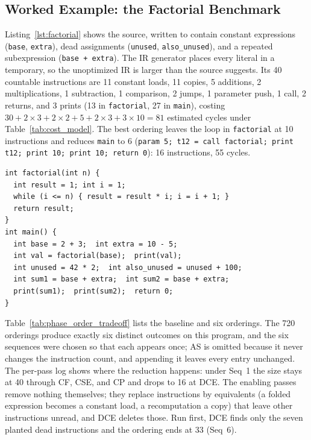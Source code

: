 \documentclass[conference]{IEEEtran}
\begin{document}
\subsection{Worked Example: the Factorial Benchmark}
\label{sec:factorial}
Listing~\ref{lst:factorial} shows the source, written to contain constant expressions (\texttt{base}, \texttt{extra}), dead assignments (\texttt{unused}, \texttt{also\_unused}), and a repeated subexpression (\texttt{base + extra}). The IR generator places every literal in a temporary, so the unoptimized IR is larger than the source suggests. Its 40 countable instructions are 11 constant loads, 11 copies, 5 additions, 2 multiplications, 1 subtraction, 1 comparison, 2 jumps, 1 parameter push, 1 call, 2 returns, and 3 prints (13 in \texttt{factorial}, 27 in \texttt{main}), costing $30 + 2 \times 3 + 2 \times 2 + 5 + 2 \times 3 + 3 \times 10 = 81$ estimated cycles under Table~\ref{tab:cost_model}. The best ordering leaves the loop in \texttt{factorial} at 10 instructions and reduces \texttt{main} to 6 (\texttt{param 5; t12 = call factorial; print t12; print 10; print 10; return 0}): 16 instructions, 55 cycles.

\begin{lstlisting}[caption={The \texttt{factorial} benchmark (comments removed).},label={lst:factorial}]
int factorial(int n) {
  int result = 1; int i = 1;
  while (i <= n) { result = result * i; i = i + 1; }
  return result;
}
int main() {
  int base = 2 + 3;  int extra = 10 - 5;
  int val = factorial(base);  print(val);
  int unused = 42 * 2;  int also_unused = unused + 100;
  int sum1 = base + extra;  int sum2 = base + extra;
  print(sum1);  print(sum2);  return 0;
}
\end{lstlisting}

Table~\ref{tab:phase_order_tradeoff} lists the baseline and six orderings. The 720 orderings produce exactly six distinct outcomes on this program, and the six sequences were chosen so that each appears once; AS is omitted because it never changes the instruction count, and appending it leaves every entry unchanged. The per-pass log shows where the reduction happens: under Seq~1 the size stays at 40 through CF, CSE, and CP and drops to 16 at DCE. The enabling passes remove nothing themselves; they replace instructions by equivalents (a folded expression becomes a constant load, a recomputation a copy) that leave other instructions unread, and DCE deletes those. Run first, DCE finds only the seven planted dead instructions and the ordering ends at 33 (Seq~6).
\end{document}
